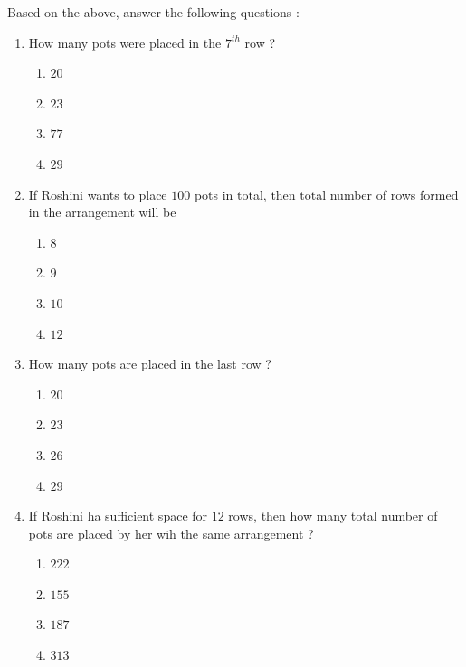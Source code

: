 \documentclass[10pt]{article}
\begin{document}
\begin{enumerate}
		Based on the above, answer the following questions :
		\begin{enumerate}[label=(\roman*)]
			\item How many pots were placed in the $7^{th}$ row ?
				\begin{enumerate}[label=\Alph*]
					\item $20$
					\item $23$
					\item $77$
					\item $29$
				\end{enumerate}
			\item If Roshini wants to place $100$ pots in total, then total number of rows formed in the arrangement will be
				\begin{enumerate}[label=\Alph*]
					\item $8$
					\item $9$
					\item $10$
					\item $12$
				\end{enumerate}
			\item How many pots are placed in the last row ?
				\begin{enumerate}
					\item $20$
					\item $23$
					\item $26$
					\item $29$
				\end{enumerate}
			\item If Roshini ha sufficient space for $12$ rows, then how many total number of pots are placed by her wih the same arrangement ?
				\begin{enumerate}
					\item $222$
					\item $155$
					\item $187$
					\item $313$
				\end{enumerate}
		\end{enumerate} 


\end{enumerate}
\end{document}

